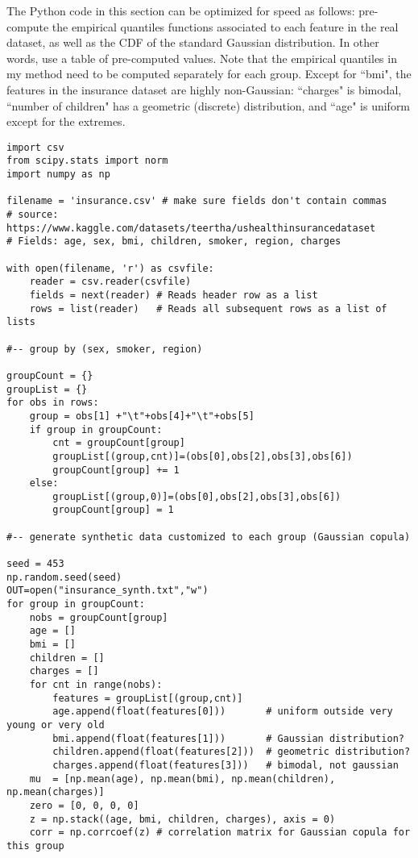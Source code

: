 \documentclass[oneside,10pt]{book}
\begin{document}
The Python code in this section can be optimized for speed as follows: pre-compute the empirical quantiles functions associated to each feature in the real dataset, as well as the CDF of the standard Gaussian distribution. In other words, use a table of pre-computed values. Note that the empirical quantiles in my method need to be computed separately for each group.
Except for ``bmi", the features in the insurance dataset are highly non-Gaussian: ``charges" is bimodal, ``number of children" has a geometric (discrete) distribution, and ``age" is uniform except for the extremes. \vspace{1ex}


\begin{lstlisting}
import csv
from scipy.stats import norm
import numpy as np

filename = 'insurance.csv' # make sure fields don't contain commas
# source: https://www.kaggle.com/datasets/teertha/ushealthinsurancedataset
# Fields: age, sex, bmi, children, smoker, region, charges

with open(filename, 'r') as csvfile:
    reader = csv.reader(csvfile)
    fields = next(reader) # Reads header row as a list
    rows = list(reader)   # Reads all subsequent rows as a list of lists

#-- group by (sex, smoker, region)

groupCount = {}
groupList = {}
for obs in rows:
    group = obs[1] +"\t"+obs[4]+"\t"+obs[5]
    if group in groupCount:
        cnt = groupCount[group]
        groupList[(group,cnt)]=(obs[0],obs[2],obs[3],obs[6])
        groupCount[group] += 1
    else:
        groupList[(group,0)]=(obs[0],obs[2],obs[3],obs[6])
        groupCount[group] = 1

#-- generate synthetic data customized to each group (Gaussian copula)

seed = 453
np.random.seed(seed)
OUT=open("insurance_synth.txt","w")
for group in groupCount:
    nobs = groupCount[group]
    age = []
    bmi = []
    children = []
    charges = []
    for cnt in range(nobs):
        features = groupList[(group,cnt)]
        age.append(float(features[0]))       # uniform outside very young or very old
        bmi.append(float(features[1]))       # Gaussian distribution?
        children.append(float(features[2]))  # geometric distribution?
        charges.append(float(features[3]))   # bimodal, not gaussian
    mu  = [np.mean(age), np.mean(bmi), np.mean(children), np.mean(charges)]
    zero = [0, 0, 0, 0]
    z = np.stack((age, bmi, children, charges), axis = 0)
    corr = np.corrcoef(z) # correlation matrix for Gaussian copula for this group


\end{lstlisting}
\end{document}
